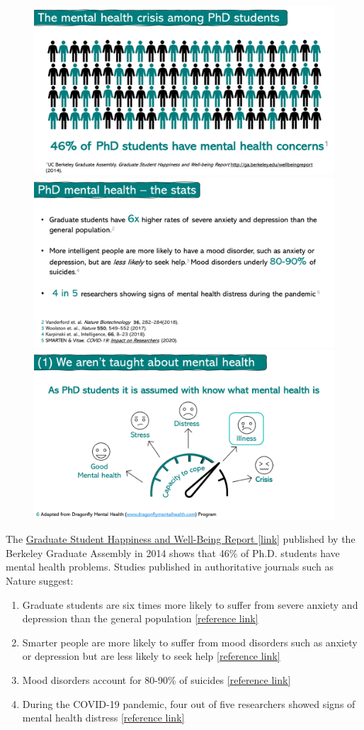 \begin{figure}[H]
    \includegraphics[width=0.6\columnwidth, center]{author-folder/Kai.Wu/mental_1.pdf}
    \includegraphics[width=0.6\columnwidth, center]{author-folder/Kai.Wu/mental_2.pdf}
    \includegraphics[width=0.6\columnwidth, center]{author-folder/Kai.Wu/mental_3.pdf}
\end{figure}

The \href{http://ga.berkeley.edu/wellbeingreport}{Graduate Student Happiness and Well-Being Report [link]} published by the Berkeley Graduate Assembly in 2014 shows that 46\% of Ph.D. students have mental health problems. Studies published in authoritative journals such as Nature suggest:
\begin{enumerate}
    \item Graduate students are six times more likely to suffer from severe anxiety and depression than the general population \href{https://www.nature.com/articles/nbt.4089}{[reference link]}
    \item Smarter people are more likely to suffer from mood disorders such as anxiety or depression but are less likely to seek help \href{https://www.nature.com/articles/nj7677-549a}{[reference link]}
    \item Mood disorders account for 80-90\% of suicides \href{https://www.sciencedirect.com/science/article/pii/S0160289616303324}{[reference link]}
    \item During the COVID-19 pandemic, four out of five researchers showed signs of mental health distress \href{https://www.tandfonline.com/doi/full/10.1080/21568235.2021.1992293}{[reference link]}
\end{enumerate}

